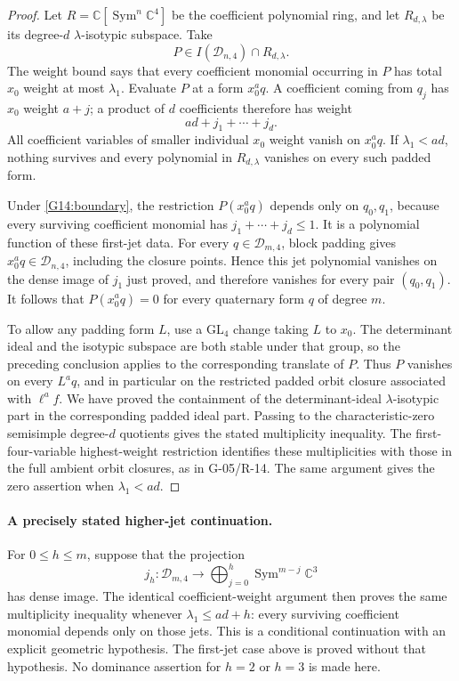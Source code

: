 \begin{proof}
Let $R=\mathbb C[\operatorname{Sym}^n\mathbb C^4]$ be
the coefficient polynomial ring, and let $R_{d,\lambda}$
be its degree-$d$ $\lambda$-isotypic subspace. Take
\[
 P\in I(\mathcal D_{n,4})\cap R_{d,\lambda}.
\]
The weight bound says that every coefficient monomial
occurring in $P$ has total $x_0$ weight at most
$\lambda_1$. Evaluate $P$ at a form $x_0^a q$. A
coefficient coming from $q_j$ has $x_0$ weight $a+j$;
a product of $d$ coefficients therefore has weight
\[
 ad+j_1+\cdots+j_d.
\]
All coefficient variables of smaller individual $x_0$
weight vanish on $x_0^a q$. If $\lambda_1<ad$, nothing
survives and every polynomial in $R_{d,\lambda}$ vanishes
on every such padded form.

Under \eqref{G14:boundary}, the restriction
$P(x_0^a q)$ depends only on $q_0,q_1$, because every
surviving coefficient monomial has
$j_1+\cdots+j_d\leq1$. It is a polynomial function of
these first-jet data. For every $q\in\mathcal D_{m,4}$,
block padding gives $x_0^a q\in\mathcal D_{n,4}$,
including the closure points. Hence this jet polynomial
vanishes on the dense image of $j_1$ just proved, and
therefore vanishes for every pair $(q_0,q_1)$. It follows
that $P(x_0^a q)=0$ for every quaternary form $q$ of
degree $m$.

To allow any padding form $L$, use a $\mathrm{GL}_4$
change taking $L$ to $x_0$. The determinant ideal and
the isotypic subspace are both stable under that group,
so the preceding conclusion applies to the corresponding
translate of $P$. Thus $P$ vanishes on every $L^a q$,
and in particular on the restricted padded orbit closure
associated with $\ell^a f$.
We have proved the containment of the determinant-ideal
$\lambda$-isotypic part in the corresponding padded ideal
part. Passing to the characteristic-zero semisimple
degree-$d$ quotients gives the stated multiplicity
inequality. The first-four-variable highest-weight
restriction identifies these multiplicities with those
in the full ambient orbit closures, as in G-05/R-14.
The same argument gives the zero assertion when
$\lambda_1<ad$.
\end{proof}

\paragraph{A precisely stated higher-jet continuation.}
For $0\leq h\leq m$, suppose that the projection
\[
 j_h:\mathcal D_{m,4}\longrightarrow
   \bigoplus_{j=0}^h\operatorname{Sym}^{m-j}\mathbb C^3
\]
has dense image. The identical coefficient-weight argument
then proves the same multiplicity inequality whenever
$\lambda_1\leq ad+h$: every surviving coefficient
monomial depends only on those jets. This is a conditional
continuation with an explicit geometric hypothesis.
The first-jet case above is proved without that hypothesis.
No dominance assertion for $h=2$ or $h=3$ is made here.

